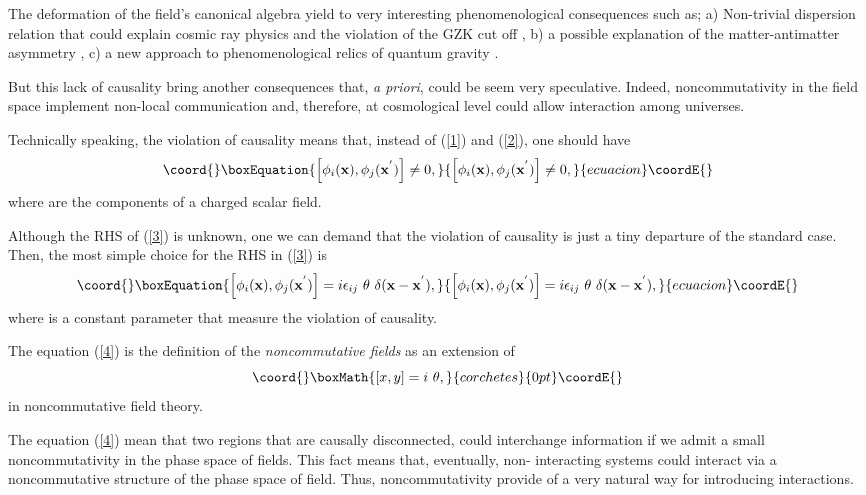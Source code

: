 \documentclass[a4paper,aps,twocolumn,amsfonts]{revtex4}
\begin{document}
   The deformation of the field's canonical algebra yield to very interesting phenomenological consequences such as; a) Non-trivial dispersion relation \cite{ccgm}  that could explain cosmic ray physics and the violation of the GZK cut off \cite{gzk}, b) a possible explanation of the matter-antimatter asymmetry \cite{rubi}  , c) a new approach to phenomenological relics of quantum gravity \cite{alot}.

   But this lack of causality bring another consequences that, {\it a priori}, could be seem very speculative. Indeed, noncommutativity in the field space implement non-local communication and, therefore, at cosmological level could allow interaction among universes.

Technically speaking, the violation of causality means that, instead of (\ref{1}) and (\ref{2}), one should have
   \begin{equation}\coord{}\boxEquation{
   \left[ \phi_i ({\bf x}), \phi_j ({\bf x}^{'})\right] \neq 0,
   \label{3}
   }{
   \left[ \phi_i ({\bf x}), \phi_j ({\bf x}^{'})\right] \neq 0,
   }{ecuacion}\coordE{}\end{equation}
   where \coordHE{} are the components of a  charged scalar field.

   Although the RHS of (\ref{3}) is unknown, one we can demand that the violation of causality is just a tiny departure of the standard case. Then,  the most simple choice for the RHS in (\ref{3}) is
   \begin{equation}\coord{}\boxEquation{
   \left[ \phi_i ({\bf x}), \phi_j ({\bf x}^{'})\right] = i \epsilon_{ij} ~\theta~
   \delta ( {\bf x} -{\bf x}^{'}),
   \label{4}
   }{
   \left[ \phi_i ({\bf x}), \phi_j ({\bf x}^{'})\right] = i \epsilon_{ij} ~\theta~
   \delta ( {\bf x} -{\bf x}^{'}),
   }{ecuacion}\coordE{}\end{equation}
   where \myHighlight{$\theta$}\coordHE{} is a constant parameter that measure the violation of causality.

   The equation (\ref{4}) is the definition of the {\it noncommutative fields} as an extension of
   \[\coord{}\boxMath{
   \left[ x,y\right] = i~ \theta,
   }{corchetes}{0pt}\coordE{}\]
   in noncommutative field theory.

   The equation (\ref{4}) mean that two regions that are causally disconnected, could interchange information if we admit a small noncommutativity  in the phase space of fields.  This fact means that, eventually,  non- interacting systems could interact via a noncommutative structure of the phase space of field. Thus, noncommutativity provide of a very natural way  for introducing interactions.
\end{document}
